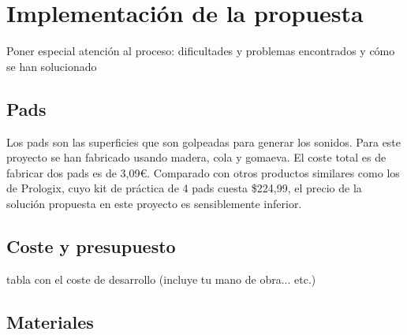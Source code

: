 \documentclass{article}
\begin{document}


\section{Implementación de la propuesta}
\label{sec:Implementacion}

    Poner especial atención al proceso: dificultades y problemas encontrados y cómo se han solucionado

        \subsection{Pads} %
        \label{sub:Pads}

            Los pads son las superficies que son golpeadas para generar los sonidos. Para este proyecto se han fabricado
            usando madera, cola y gomaeva\cite{GomaEva}. El coste total es de fabricar dos pads es de 3,09\euro{}.
            Comparado con otros productos similares como los de Prologix\cite{practice_pad}, cuyo kit de práctica de 4
            pads cuesta \$224,99, el precio de la solución propuesta en este proyecto es sensiblemente inferior.


        \subsection{Coste y presupuesto} %
        \label{sub:CosteYPresupuesto}

            tabla con el coste de desarrollo (incluye tu mano de obra... etc.)


        \subsection{Materiales} %
        \label{sub:Materiales}
\end{document}
